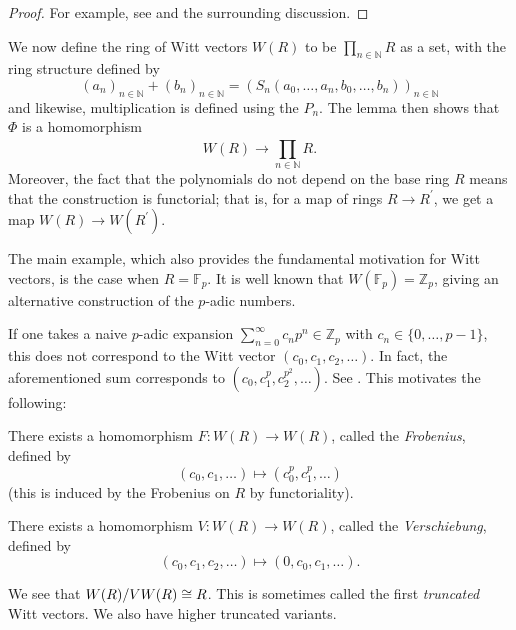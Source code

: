 \begin{proof}
	For example, see \cite[Theorem~2.6]{rabinoff-2014-witt-vec} and the 
	surrounding discussion.
\end{proof}

We now define the ring of Witt vectors 
\(W(R)\) to be 
\(\prod_{n \in \mathbb{N}}^{} R \) 
as a set, with the ring structure defined
by 
\[
	(a_{n})_{n \in \mathbb{N}} + 
	(b_{n})_{n \in \mathbb{N}} =
	(S_{n}(a_{0}, \ldots, a_{n}, b_{0}, \ldots, b_{n}))_{n \in \mathbb{N}}
\] 
and likewise, multiplication is defined
using the \(P_{n}\).
The lemma then shows that \(\Phi\) is a homomorphism 
\[
	W(R) \xrightarrow{} \prod_{n \in \mathbb{N}}^{} R 
.\] 
Moreover, the fact that the polynomials do not depend on the base
ring \(R\) means that the construction is functorial; that is,
for a map of rings \(R \xrightarrow{} R^{\prime} \), we get a 
map \(W(R) \xrightarrow{} W(R^{\prime})\).

The main example, which also provides the fundamental motivation
for Witt vectors, is the case when \(R = \mathbb{F}_{p}\).
It is well known that \(W(\mathbb{F}_{p}) = \mathbb{Z}_{p}\), 
giving an alternative construction of the \(p\)-adic numbers.

\begin{warn}
	If one takes a
    naive \(p\)-adic expansion 
    \(\sum_{n = 0}^{\infty} c_{n}p^{n} \in \mathbb{Z}_{p}\)
    with \(c_{n} \in \{0, \ldots, p-1\}\), this does not correspond
    to the Witt vector \((c_{0}, c_{1}, c_{2}, \ldots)\).
    In fact, the aforementioned sum corresponds to 
    \((c_{0}, c_{1}^{p}, c_{2}^{p^{2}}, \ldots)\). See
	\cite[Section~2]{kim-2017-witt-vec}. 
    This motivates the following: 
\end{warn}

\begin{defn}
	There exists a homomorphism \(F \colon W(R) \xrightarrow{} W(R)\),
	called the \textit{Frobenius},
	defined by
	\[
	 (c_{0}, c_{1}, \ldots) \mapsto (c_{0}^{p}, c_{1}^{p}, \ldots)
	\] 
    (this is induced by the Frobenius on \(R\) by functoriality).
\end{defn}

\begin{defn}
	There exists a homomorphism \(V \colon W(R) \xrightarrow{} W(R)\),
	called the \textit{Verschiebung},
	defined by
	\[
		(c_{0}, c_{1}, c_{2}, \ldots) \mapsto  (0, c_{0}, c_{1}, \ldots)
	.\] 
\end{defn}

We see that \(W(R) / VW(R) \cong R\).
This is sometimes called the first \textit{truncated}
Witt vectors.
We also have higher truncated variants.

